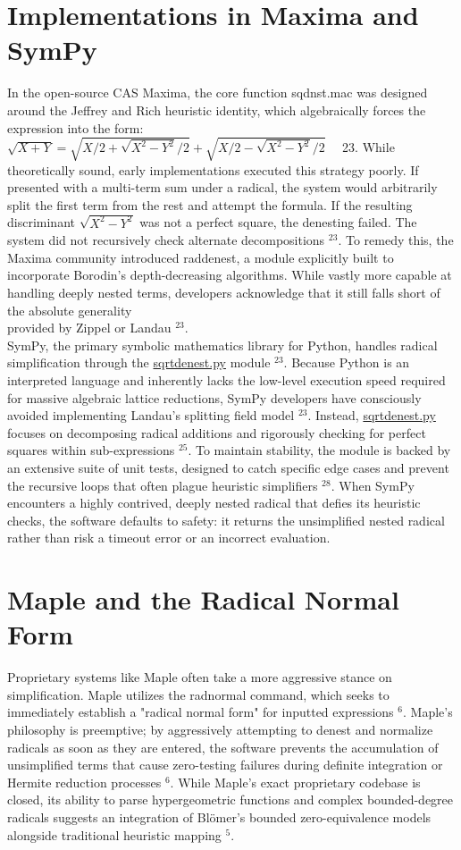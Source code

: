 \documentclass[10pt]{article}
\begin{document}
\section*{Implementations in Maxima and SymPy}
In the open-source CAS Maxima, the core function sqdnst.mac was designed around the Jeffrey and Rich heuristic identity, which algebraically forces the expression into the form: $\sqrt{X+Y}=\sqrt{X / 2+\sqrt{X^{2}-Y^{2}} / 2}+\sqrt{X / 2-\sqrt{X^{2}-Y^{2}} / 2} \quad$ 23. While theoretically sound, early implementations executed this strategy poorly. If presented with a multi-term sum under a radical, the system would arbitrarily split the first term from the rest and attempt the formula. If the resulting discriminant $\sqrt{X^{2}-Y^{2}}$ was not a perfect square, the denesting failed. The system did not recursively check alternate decompositions ${ }^{23}$. To remedy this, the Maxima community introduced raddenest, a module explicitly built to incorporate Borodin's depth-decreasing algorithms. While vastly more capable at handling deeply nested terms, developers acknowledge that it still falls short of the absolute generality\\
provided by Zippel or Landau ${ }^{23}$.\\
SymPy, the primary symbolic mathematics library for Python, handles radical simplification through the \href{http://sqrtdenest.py}{sqrtdenest.py} module ${ }^{23}$. Because Python is an interpreted language and inherently lacks the low-level execution speed required for massive algebraic lattice reductions, SymPy developers have consciously avoided implementing Landau's splitting field model ${ }^{23}$. Instead, \href{http://sqrtdenest.py}{sqrtdenest.py} focuses on decomposing radical additions and rigorously checking for perfect squares within sub-expressions ${ }^{25}$. To maintain stability, the module is backed by an extensive suite of unit tests, designed to catch specific edge cases and prevent the recursive loops that often plague heuristic simplifiers ${ }^{28}$. When SymPy encounters a highly contrived, deeply nested radical that defies its heuristic checks, the software defaults to safety: it returns the unsimplified nested radical rather than risk a timeout error or an incorrect evaluation.

\section*{Maple and the Radical Normal Form}
Proprietary systems like Maple often take a more aggressive stance on simplification. Maple utilizes the radnormal command, which seeks to immediately establish a "radical normal form" for inputted expressions ${ }^{6}$. Maple's philosophy is preemptive; by aggressively attempting to denest and normalize radicals as soon as they are entered, the software prevents the accumulation of unsimplified terms that cause zero-testing failures during definite integration or Hermite reduction processes ${ }^{6}$. While Maple's exact proprietary codebase is closed, its ability to parse hypergeometric functions and complex bounded-degree radicals suggests an integration of Blömer's bounded zero-equivalence models alongside traditional heuristic mapping ${ }^{5}$.
\end{document}
